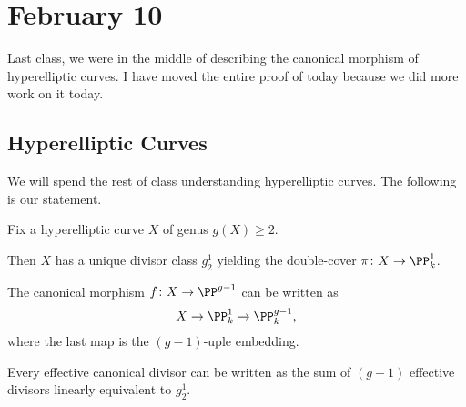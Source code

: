 \documentclass[../notes.tex]{subfiles}
\begin{document}
\section{February 10}

Last class, we were in the middle of describing the canonical morphism of hyperelliptic curves. I have moved the entire proof of today because we did more work on it today.

\subsection{Hyperelliptic Curves}
We will spend the rest of class understanding hyperelliptic curves. The following is our statement.
\begin{theorem} \label{thm:hyper-canonical-divisor}
	Fix a hyperelliptic curve $X$ of genus $g(X)\ge2$.
	\begin{listalph}
		\item Then $X$ has a unique divisor class $g^1_2$ yielding the double-cover $\pi\colon X\to\PP^1_k$.
		\item The canonical morphism $f\colon X\to\PP^{g-1}$ can be written as
		\[X\to\PP^1_k\to\PP^{g-1}_k,\]
		where the last map is the $(g-1)$-uple embedding.
		\item Every effective canonical divisor can be written as the sum of $(g-1)$ effective divisors linearly equivalent to $g^1_2$.
	\end{listalph}
\end{theorem}
\end{document}

